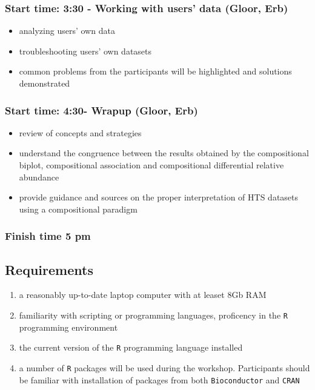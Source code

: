 \documentclass[twocolumn]{article}
\providecommand{\tightlist}{%
  \setlength{\itemsep}{0pt}\setlength{\parskip}{0pt}}
\begin{document}
\hypertarget{start-time-330---working-with-users-data-gloor-erb}{%
\subsubsection{Start time: 3:30 - Working with users' data (Gloor,
Erb)}\label{start-time-330---working-with-users-data-gloor-erb}}

\begin{itemize}
\tightlist
\item
  analyzing users' own data
\item
  troubleshooting users' own datasets
\item
  common problems from the participants will be highlighted and
  solutions demonstrated
\end{itemize}

\hypertarget{start-time-430--wrapup-gloor-erb}{%
\subsubsection{Start time: 4:30- Wrapup (Gloor,
Erb)}\label{start-time-430--wrapup-gloor-erb}}

\begin{itemize}
\tightlist
\item
  review of concepts and strategies
\item
  understand the congruence between the results obtained by the
  compositional biplot, compositional association and compositional
  differential relative abundance
\item
  provide guidance and sources on the proper interpretation of HTS
  datasets using a compositional paradigm
\end{itemize}

\hypertarget{finish-time-5-pm}{%
\subsubsection{Finish time 5 pm}\label{finish-time-5-pm}}

\hypertarget{requirements}{%
\subsection{Requirements}\label{requirements}}

\begin{enumerate}
\def\labelenumi{\arabic{enumi}.}
\item
  a reasonably up-to-date laptop computer with at leaset 8Gb RAM
\item
  familiarity with scripting or programming languages, proficency in the
  \texttt{R} programming environment
\item
  the current version of the \texttt{R} programming language installed
\item
  a number of \texttt{R} packages will be used during the workshop.
  Participants should be familiar with installation of packages from
  both \texttt{Bioconductor} and \texttt{CRAN}
\end{enumerate}
\end{document}
